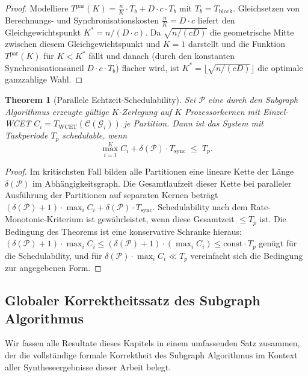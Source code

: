 ﻿\documentclass[12pt,a4paper]{article}
\newtheorem{theorem}{Theorem}[section]
\theoremstyle{definition}
\begin{document}
\begin{proof}
Modelliere $T^{\mathrm{par}}(K) = \frac{n}{K} \cdot T_b + D \cdot c \cdot T_b$
mit $T_b = T_{\mathrm{block}}$. Gleichsetzen von Berechnungs- und
Synchronisationskosten $\frac{n}{K} = D \cdot c$ liefert den
Gleichgewichtspunkt $K^* = n / (D \cdot c)$. Da $\sqrt{n/(cD)}$ die
geometrische Mitte zwischen diesem Gleichgewichtspunkt und $K = 1$
darstellt und die Funktion $T^{\mathrm{par}}(K)$ für $K < K^*$ fällt
und danach (durch den konstanten Synchronisationsaneil $D \cdot c \cdot T_b$)
flacher wird, ist $K^* = \lfloor\sqrt{n/(cD)}\rfloor$ die optimale
ganzzahlige Wahl.
\end{proof}

\begin{theorem}[Parallele Echtzeit-Schedulability]
\label{thm:par-schedule}
Sei $\mathcal{P}$ eine durch den Subgraph Algorithmus erzeugte gültige
$K$-Zerlegung auf $K$ Prozessorkernen mit Einzel-WCET
$C_i = T_{\mathrm{WCET}}(\mathcal{C}(\mathcal{G}_i))$ je Partition.
Dann ist das System mit Taskperiode $T_p$ schedulable, wenn
\[
  \max_{i=1}^K C_i + \delta(\mathcal{P}) \cdot T_{\mathrm{sync}}
  \;\leq\;
  T_p.
\]
\end{theorem}

\begin{proof}
Im kritischsten Fall bilden alle Partitionen eine lineare Kette der Länge
$\delta(\mathcal{P})$ im Abhängigkeitsgraph. Die Gesamtlaufzeit dieser
Kette bei paralleler Ausführung der Partitionen auf separaten Kernen
beträgt $(\delta(\mathcal{P})+1) \cdot \max_i C_i + \delta(\mathcal{P})
\cdot T_{\mathrm{sync}}$.
Schedulability nach dem Rate-Monotonic-Kriterium \cite{liu1973} ist
gewährleistet, wenn diese Gesamtzeit $\leq T_p$ ist. Die Bedingung des
Theorems ist eine konservative Schranke hieraus:
$(\delta(\mathcal{P})+1) \cdot \max_i C_i \leq
(\delta(\mathcal{P})+1) \cdot (\max_i C_i) \leq
\text{const} \cdot T_p$ genügt für die Schedulability, und für
$\delta(\mathcal{P}) \cdot \max_i C_i \ll T_p$ vereinfacht sich
die Bedingung zur angegebenen Form.
\end{proof}

\subsection{Globaler Korrektheitssatz des Subgraph Algorithmus}
\label{subsec:subgraph-global}

Wir fassen alle Resultate dieses Kapitels in einem umfassenden Satz zusammen,
der die vollständige formale Korrektheit des Subgraph Algorithmus im
Kontext aller Syntheseergebnisse dieser Arbeit belegt.
\end{document}
